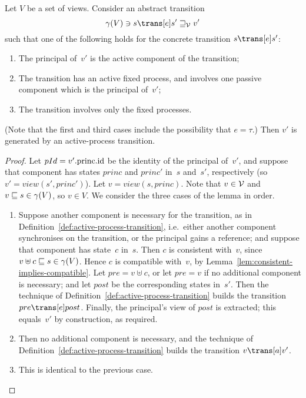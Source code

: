 
\begin{lemma}
\label{lem:active-process-transitions}
Let $V$ be a set of views.  Consider an abstract transition
\[
\gamma(V) \ni s \trans[e] s' \sqge_{\V} v'
\]
such that one of the following holds for the concrete transition $s \trans[e]
s'$:
\begin{enumerate}
\item The principal of~$v'$ is the active component of the transition;

\item The transition has an active fixed process, and involves one passive
  component which is the principal of~$v'$;

\item The transition involves only the fixed processes.
\end{enumerate}
%
(Note that the first and third cases include the possibility that $e = \tau$.)
Then $v'$ is generated by an active-process transition.
\end{lemma}


\begin{proof}
Let $pId = v'.\mathrm{princ}.\mathrm{id}$ be the identity of the principal of~$v'$, and
suppose that component has states $princ$ and $princ'$ in~$s$ and~$s'$,
respectively (so $v' = view(s', princ')$). Let $v = view(s, princ)$.  Note
that $v \in \mathcal{V}$ and $v \sqsubseteq s \in \gamma(V)$, so $v \in V$.  We consider the
three cases of the lemma in order.
%
\begin{enumerate}
\item
Suppose another component is necessary for the transition, as in
Definition~\ref{def:active-process-transition}, i.e.~either another component
synchronises on the transition, or the principal gains a reference; and
suppose that component has state~$c$ in~$s$.  Then $c$ is consistent
with~$v$, since $v \uplus c \sqsubseteq s \in \gamma(V)$.  Hence $c$ is compatible
with~$v$, by Lemma~\ref{lem:consistent-implies-compatible}. 
%
Let $pre = v \uplus c$, or let $pre = v$ if no additional component is
necessary; and let $post$ be the corresponding states in~$s'$.  Then the
technique of Definition~\ref{def:active-process-transition} builds the
transition \( pre \trans[e] post \).  Finally, the principal's view of $post$
is extracted; this equals~$v'$ by construction, as required. 

\item Then no additional component is necessary, and the technique of
  Definition~\ref{def:active-process-transition} builds the transition $v
  \trans[a] v'$.

\item This is identical to the previous case.
\end{enumerate}
\end{proof}


